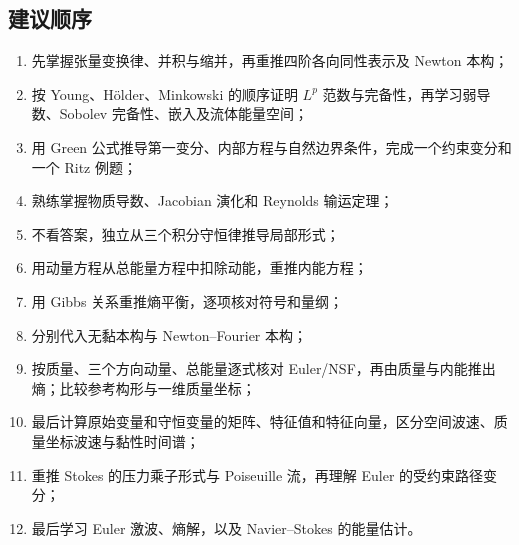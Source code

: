 \documentclass[cn,hazy,blue,11pt,normal]{elegantnote}
\numberwithin{equation}{section}
\begin{document}
\subsection*{建议顺序}
\begin{enumerate}
 \item 先掌握张量变换律、并积与缩并，再重推四阶各向同性表示及 Newton 本构；
 \item 按 Young、H\"older、Minkowski 的顺序证明 $L^p$ 范数与完备性，再学习弱导数、Sobolev 完备性、嵌入及流体能量空间；
 \item 用 Green 公式推导第一变分、内部方程与自然边界条件，完成一个约束变分和一个 Ritz 例题；
 \item 熟练掌握物质导数、Jacobian 演化和 Reynolds 输运定理；
 \item 不看答案，独立从三个积分守恒律推导局部形式；
 \item 用动量方程从总能量方程中扣除动能，重推内能方程；
 \item 用 Gibbs 关系重推熵平衡，逐项核对符号和量纲；
 \item 分别代入无黏本构与 Newton--Fourier 本构；
 \item 按质量、三个方向动量、总能量逐式核对 Euler/NSF，再由质量与内能推出熵；比较参考构形与一维质量坐标；
 \item 最后计算原始变量和守恒变量的矩阵、特征值和特征向量，区分空间波速、质量坐标波速与黏性时间谱；
 \item 重推 Stokes 的压力乘子形式与 Poiseuille 流，再理解 Euler 的受约束路径变分；
 \item 最后学习 Euler 激波、熵解，以及 Navier--Stokes 的能量估计。
\end{enumerate}
\end{document}
